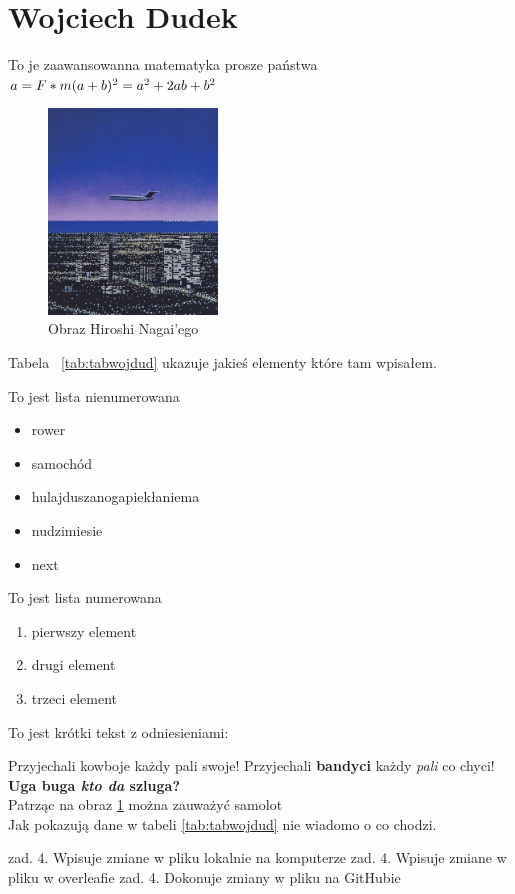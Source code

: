 \section{Wojciech Dudek}
\label{sec:wojdud}

To je zaawansowanna matematyka prosze państwa
\begin{math}
\\a = F*m
\\(a+b)^2 = a^2 + 2ab + b^2
\end{math}

\begin{figure}[htbp]
    \centering   
    \includegraphics[width=0.4\textwidth]{pictures/fotalatex.jpg}
    \caption{Obraz Hiroshi Nagai'ego}
    \label{fig:animuobrazek}
\end{figure}

Tabela ~\ref{tab:tabwojdud} ukazuje jakieś elementy które tam wpisałem.



To jest lista nienumerowana
\begin{itemize}
    \item rower
    \item samochód
    \item hulajduszanogapiekłaniema
    \item nudzimiesie
    \item next
\end{itemize}

To jest lista numerowana
\begin{enumerate}
    \item pierwszy element
    \item drugi element
    \item trzeci element
\end{enumerate}

To jest krótki tekst z odniesieniami:

Przyjechali kowboje każdy pali swoje!
Przyjechali \textbf{bandyci} każdy \textit{pali} co chyci!
\textbf{Uga buga \emph{kto da} szluga?}\\ 
Patrząc na obraz \ref{fig:animuobrazek} można zauważyć samolot\\
Jak pokazują dane w tabeli \ref{tab:tabwojdud} nie wiadomo o co chodzi.

zad. 4. Wpisuje zmiane w pliku lokalnie na komputerze
zad. 4. Wpisuje zmiane w pliku w overleafie
zad. 4. Dokonuje zmiany w pliku na GitHubie
